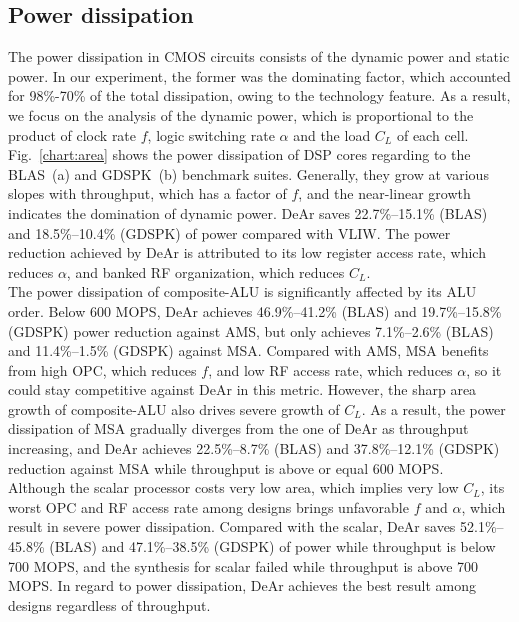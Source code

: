 {    \subsection{Power dissipation}
    The power dissipation in CMOS circuits consists of the dynamic power and static power.
    In our experiment, the former was the dominating factor, which accounted for 98\%-70\% of the total dissipation, 
    owing to the technology feature.
    As a result, we focus on the analysis of the dynamic power, 
    which is proportional to the product of clock rate $f$, logic switching rate $\alpha$ and the load $C_L$ of each cell.
    \\\indent
    Fig.~\ref{chart:area} shows the power dissipation of DSP cores regarding to the BLAS~(a) and GDSPK~(b) benchmark suites.
    Generally, they grow at various slopes with throughput, which has a factor of $f$, 
    and the near-linear growth indicates the domination of dynamic power.
    DeAr saves 22.7\%--15.1\% (BLAS) and 18.5\%--10.4\% (GDSPK) of power compared with VLIW.
    The power reduction achieved by DeAr is attributed to its low register access rate, which reduces $\alpha$, 
    and banked RF organization, which reduces $C_L$.
    \\\indent
    The power dissipation of composite-ALU is significantly affected by its ALU order.
    Below 600 MOPS, DeAr achieves 46.9\%--41.2\% (BLAS) and 19.7\%--15.8\% (GDSPK) power reduction against AMS, 
    but only achieves 7.1\%--2.6\% (BLAS) and 11.4\%--1.5\% (GDSPK) against MSA.  
    Compared with AMS, MSA benefits from high OPC, which reduces $f$, and low RF access rate, which reduces $\alpha$, 
    so it could stay competitive against DeAr in this metric.
    However, the sharp area growth of composite-ALU also drives severe growth of $C_L$.
    As a result, the power dissipation of MSA gradually diverges from the one of DeAr as throughput increasing, 
    and DeAr achieves 22.5\%--8.7\% (BLAS) and 37.8\%--12.1\% (GDSPK) reduction against MSA while throughput is above or equal 600 MOPS.
    \\\indent
    Although the scalar processor costs very low area, which implies very low $C_L$, 
    its worst OPC and RF access rate among designs brings unfavorable $f$ and $\alpha$, 
    which result in severe power dissipation. 
    Compared with the scalar, DeAr saves 52.1\%--45.8\% (BLAS) and 47.1\%--38.5\% (GDSPK) of power while throughput is below 700 MOPS, 
    and the synthesis for scalar failed while throughput is above 700 MOPS.
    In regard to power dissipation, DeAr achieves the best result among designs regardless of throughput.
}
